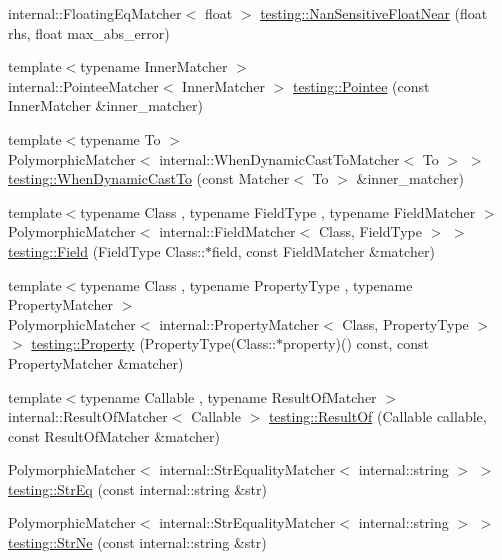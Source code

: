 \begin{DoxyCompactItemize}
\item 
internal\+::\+Floating\+Eq\+Matcher$<$ float $>$ \hyperlink{namespacetesting_a347ebf0075ca9470e71e8ac468c9818f}{testing\+::\+Nan\+Sensitive\+Float\+Near} (float rhs, float max\+\_\+abs\+\_\+error)
\item 
{\footnotesize template$<$typename Inner\+Matcher $>$ }\\internal\+::\+Pointee\+Matcher$<$ Inner\+Matcher $>$ \hyperlink{namespacetesting_a5122ca3533f3a00f67e146dd81f3b68c}{testing\+::\+Pointee} (const Inner\+Matcher \&inner\+\_\+matcher)
\item 
{\footnotesize template$<$typename To $>$ }\\Polymorphic\+Matcher$<$ internal\+::\+When\+Dynamic\+Cast\+To\+Matcher$<$ To $>$ $>$ \hyperlink{namespacetesting_aabfc320cc132d0a1da2a255b45a17b7a}{testing\+::\+When\+Dynamic\+Cast\+To} (const Matcher$<$ To $>$ \&inner\+\_\+matcher)
\item 
{\footnotesize template$<$typename Class , typename Field\+Type , typename Field\+Matcher $>$ }\\Polymorphic\+Matcher$<$ internal\+::\+Field\+Matcher$<$ Class, Field\+Type $>$ $>$ \hyperlink{namespacetesting_a4df3849391696aa93ac3a7703a717c2a}{testing\+::\+Field} (Field\+Type Class\+::$\ast$field, const Field\+Matcher \&matcher)
\item 
{\footnotesize template$<$typename Class , typename Property\+Type , typename Property\+Matcher $>$ }\\Polymorphic\+Matcher$<$ internal\+::\+Property\+Matcher$<$ Class, Property\+Type $>$ $>$ \hyperlink{namespacetesting_a0fad10571e23f7bc0d5c83d4c31ba740}{testing\+::\+Property} (Property\+Type(Class\+::$\ast$property)() const, const Property\+Matcher \&matcher)
\item 
{\footnotesize template$<$typename Callable , typename Result\+Of\+Matcher $>$ }\\internal\+::\+Result\+Of\+Matcher$<$ Callable $>$ \hyperlink{namespacetesting_aaadb51dd383baa95f123ab891d4f8a5f}{testing\+::\+Result\+Of} (Callable callable, const Result\+Of\+Matcher \&matcher)
\item 
Polymorphic\+Matcher$<$ internal\+::\+Str\+Equality\+Matcher$<$ internal\+::string $>$ $>$ \hyperlink{namespacetesting_a154de81376ae7d584c6e5a619b45fb09}{testing\+::\+Str\+Eq} (const internal\+::string \&str)
\item 
Polymorphic\+Matcher$<$ internal\+::\+Str\+Equality\+Matcher$<$ internal\+::string $>$ $>$ \hyperlink{namespacetesting_a6f6b8af3d19cb969df0eb995c47a14d2}{testing\+::\+Str\+Ne} (const internal\+::string \&str)

\end{DoxyCompactItemize}
